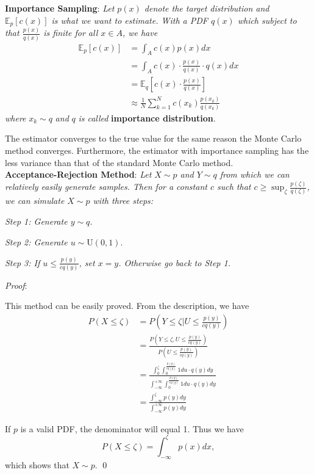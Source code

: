 \documentclass{progartcn}
\begin{document}
		\textbf{Importance Sampling}: \textit{Let $p(x)$ denote the target distribution and $\mathbb{E}_p[c(x)]$ is what we want to estimate. With a PDF $q(x)$ which subject to that $\frac{p(x)}{q(x)}$ is finite for all $x\in A$, we have}
		\[
		\begin{split}
		\mathbb{E}_p[c(x)]&=\int_A c(x)p(x)dx\\
		&=\int_A c(x)\cdot \frac{p(x)}{q(x)} \cdot q(x)dx\\
		&=\mathbb{E}_q\left[c(x)\cdot \frac{p(x)}{q(x)}\right]\\
		&\approx \frac{1}{N}\sum_{k=1}^N c(x_k)\frac{p(x_k)}{q(x_k)}
		\end{split}
		\label{eq_importance_sampling}
		\]
		\textit{where} $x_k\sim q$ \textit{and} $q$ \textit{is called} \textbf{importance distribution}.

		The estimator converges to the true value for the same reason the Monte Carlo method converges. Furthermore, the estimator with importance sampling has the less variance than that of the standard Monte Carlo method.\\

		\textbf{Acceptance-Rejection Method}: \textit{Let $X\sim p$ and $Y\sim q$ from which we can relatively easily generate samples. Then for a constant $c$ such that $c\ge \sup_\zeta \frac{p(\zeta)}{q(\zeta)}$, we can simulate $X\sim p$ with three steps:}

		\qquad \textit{Step 1: Generate $y\sim q$.}

		\qquad \textit{Step 2: Generate $u\sim$}$\text{U}(0,1)$.

		\qquad \textit{Step 3: If $u\le\frac{p(y)}{cq(y)}$, set $x=y$. Otherwise go back to Step 1.}

		\textit{Proof}:

		This method can be easily proved. From the description, we have
		\[\begin{split}
		P(X\le \zeta)&=P\left(Y\le\zeta|U\le \frac{p(y)}{cq(y)}\right)\\
		&=\frac{P(Y\le \zeta, U\le \frac{p(y)}{cq(y)})}{P(U\le \frac{p(y)}{cq(y)})}\\
		&=\frac{\int_0^\zeta \int_0^{\frac{p(y)}{cq(y)}} 1du\cdot q(y)dy}{\int_{-\infty}^{+\infty}\int_0^{\frac{p(y)}{cq(y)}} 1du\cdot q(y)dy}\\
		&=\frac{\int_{-\infty}^\zeta p(y)dy}{\int_{-\infty}^{+\infty}p(y)dy}
		\end{split}
		\]

		If $p$ is a valid PDF, the denominator will equal 1. Thus we have
		\[P(X\le\zeta)=\int_{-\infty}^\zeta p(x)dx,\]
		which shows that $X\sim p$.
		\qed\\
\end{document}
